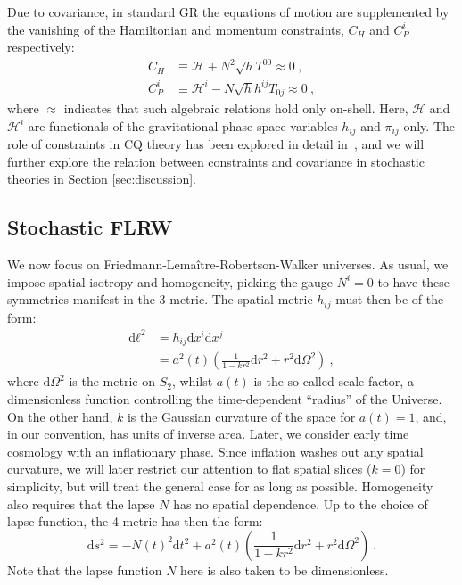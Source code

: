\documentclass[amsmath,amssymb,11pt]{article}
\begin{document}
Due to covariance, in standard GR the equations of motion are supplemented by the vanishing of the Hamiltonian and momentum constraints, $C_H$ and $C_P^i$ respectively:
\begin{align}
    C_{H} &\equiv\mathcal{H} + N^2 \sqrt{h}T^{00} \approx 0 \ , \\
    C_{P}^i &\equiv \mathcal{H}^i - N \sqrt{h} h^{ij}T_{0j} \approx 0 \ ,
\end{align}
where $\approx$ indicates that such algebraic relations hold only on-shell. Here, $\mathcal{H}$ and $\mathcal{H}^i$ are functionals of the gravitational phase space variables $h_{ij}$ and $\pi_{ij}$ only. The role of constraints in CQ theory has been explored in detail in~\cite{oppenheim2022constraints}, and we will further explore the relation between constraints and covariance in stochastic theories in Section \ref{sec:discussion}. 

\subsection{Stochastic FLRW}\label{sec:FLRW}
We now focus on Friedmann-Lema\^{i}tre-Robertson-Walker universes. As usual, we impose spatial isotropy and homogeneity, picking the gauge $N^i=0$ to have these symmetries manifest in the 3-metric. The spatial metric $h_{ij}$ must then be of the form:
\begin{equation}
\begin{split}
    \text{d}\ell^2 &= h_{ij} \text{d}x^i \text{d}x^j \\
    &= a^2(t) \left(\frac{1}{1-kr^2} \text{d}r^2 + r^2 \text{d}\Omega^2\right) \ ,
\end{split}
\end{equation}
where $\text{d}\Omega^2$ is the metric on $S_2$, whilst $a(t)$ is the so-called scale factor, a dimensionless function controlling the time-dependent “radius” of the Universe. On the other hand, $k$ is the Gaussian curvature of the space for $a(t)=1$, and, in our convention, has units of inverse area. Later, we consider early time cosmology with an inflationary phase. Since inflation washes out any spatial curvature, we will later restrict our attention to flat spatial slices ($k=0$) for simplicity, but will treat the general case for as long as possible. Homogeneity also requires that the lapse $N$ has no spatial dependence. Up to the choice of lapse function, the 4-metric has then the form:
\begin{equation}
    \text{d}s^2 = -N(t)^2 \text{d}t^2 + a^2(t) \left(\frac{1}{1-kr^2} \text{d}r^2 + r^2 \text{d}\Omega^2\right) \ .
\end{equation}
Note that the lapse function $N$ here is also taken to be dimensionless.
\end{document}
